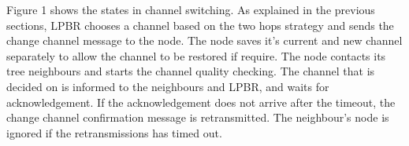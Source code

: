 Figure 1 shows the states in channel switching. As explained in the previous sections, LPBR chooses a channel based on the two hops strategy and sends the change channel message to the node. The node saves it's current and new channel separately to allow the channel to be restored if require. The node contacts its tree neighbours and starts the channel quality checking. The channel that is decided on is informed to the neighbours and LPBR, and waits for acknowledgement. If the acknowledgement does not arrive after the timeout, the change channel confirmation message is retransmitted. The neighbour's node is ignored if the retransmissions has timed out. 



